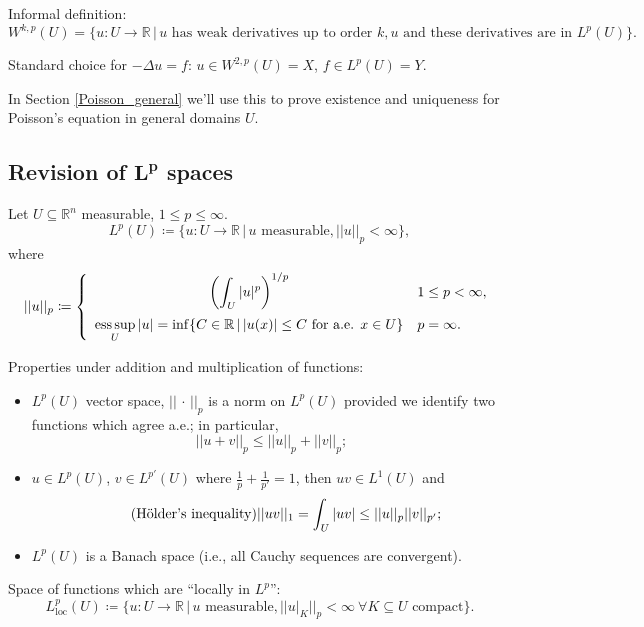 \documentclass[12pt]{article}
\DeclareMathOperator*{\esssup}{ess\,sup}
\theoremstyle{definition}
\begin{document}
Informal definition:
\[W^{k,p}(U)=\{u:U\rightarrow\mathbb{R}\,|\,u\text{ has weak derivatives up to order }k,u\text{ and these derivatives are in }L^p(U)\}.\]

Standard choice for $-\Delta u=f$: $u\in W^{2,p}(U)=X$, $f\in L^p(U)=Y$.

In Section \ref{Poisson_general} we'll use this to prove existence and uniqueness for Poisson's equation in general domains $U$.

\setcounter{subsection}{-1}
\subsection[Revision of \texorpdfstring{$L^p$}{L\^{}p} spaces]{Revision of \texorpdfstring{$\boldsymbol{L^p}$}{L\^p} spaces}
Let $U\subseteq\mathbb{R}^n$ measurable, $1\leq p\leq\infty$.
\[L^p(U)\coloneqq\{u:U\rightarrow\mathbb{R}\,|\,u\text{ measurable},||u||_p<\infty\},\]
where
\[||u||_p\coloneqq\left\{\begin{array}{cl}\displaystyle{\left(\int_U|u|^p\right)^{1/p}}&1\leq p<\infty,\vspace{2mm}\\\displaystyle{\esssup_U|u|=\inf\{C\in\mathbb{R}\,|\,|u(x)|\leq C\text{ for a.e. }x\in U\}}&p=\infty.\end{array}\right.\]

Properties under addition and multiplication of functions:
\begin{itemize}
\item $L^p(U)$ vector space, $||\,\cdot\,||_p$ is a norm on $L^p(U)$ provided we identify two functions which agree a.e.; in particular,
\begin{equation}\tag{Minkowski's inequality}
||u+v||_p\leq||u||_p+||v||_p;
\end{equation}
\item $u\in L^p(U)$, $v\in L^{p'}(U)$ where $\frac{1}{p}+\frac{1}{p'}=1$, then $uv\in L^1(U)$ and
\begin{equation}\tag{H\"{o}lder's inequality}
||uv||_1=\int_U|uv|\leq||u||_p||v||_{p'};
\end{equation}
\item $L^p(U)$ is a Banach space (i.e., all Cauchy sequences are convergent).
\end{itemize}

Space of functions which are ``locally in $L^p$'':
\[L_{\text{loc}}^p(U)\coloneqq\big\{u:U\rightarrow\mathbb{R}\,\big|\,u\text{ measurable},\big|\big|u|_K\big|\big|_p<\infty\ \forall K\subseteq U\text{ compact}\big\}.\]
\end{document}
